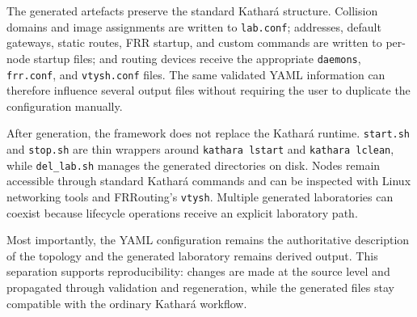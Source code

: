 The generated artefacts preserve the standard Kathar\'a structure. Collision
domains and image assignments are written to \texttt{lab.conf}; addresses,
default gateways, static routes, FRR startup, and custom commands are written
to per-node startup files; and routing devices receive the appropriate
\texttt{daemons}, \texttt{frr.conf}, and \texttt{vtysh.conf} files. The same
validated YAML information can therefore influence several output files without
requiring the user to duplicate the configuration manually.

After generation, the framework does not replace the Kathar\'a runtime.
\texttt{start.sh} and \texttt{stop.sh} are thin wrappers around
\texttt{kathara lstart} and \texttt{kathara lclean}, while
\texttt{del\_lab.sh} manages the generated directories on disk. Nodes remain
accessible through standard Kathar\'a commands and can be inspected with Linux
networking tools and FRRouting's \texttt{vtysh}. Multiple generated laboratories
can coexist because lifecycle operations receive an explicit laboratory path.

Most importantly, the YAML configuration remains the authoritative description
of the topology and the generated laboratory remains derived output. This
separation supports reproducibility: changes are made at the source level and
propagated through validation and regeneration, while the generated files stay
compatible with the ordinary Kathar\'a workflow.
